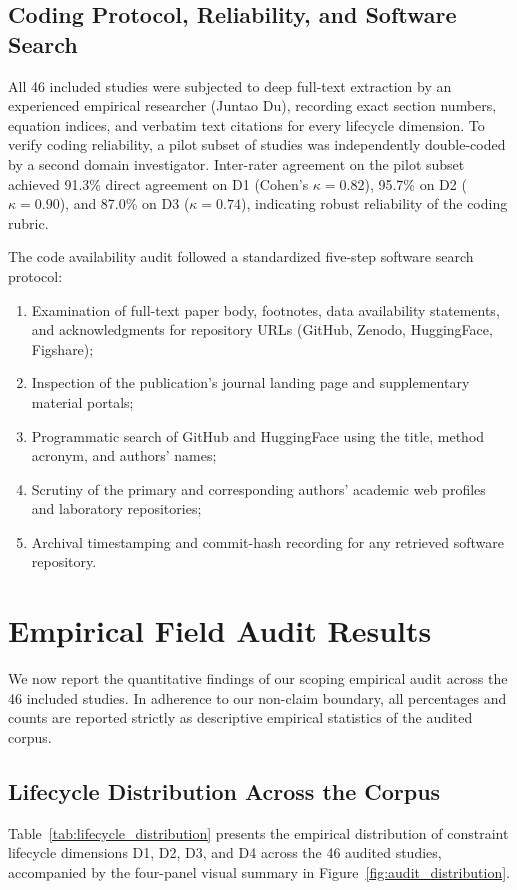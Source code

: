 \documentclass[preprint,3p,times]{elsarticle}
\begin{document}
\subsection{Coding Protocol, Reliability, and Software Search}
All 46 included studies were subjected to deep full-text extraction by an experienced empirical researcher (Juntao Du), recording exact section numbers, equation indices, and verbatim text citations for every lifecycle dimension. To verify coding reliability, a pilot subset of studies was independently double-coded by a second domain investigator. Inter-rater agreement on the pilot subset achieved 91.3\% direct agreement on D1 (Cohen's $\kappa = 0.82$), 95.7\% on D2 ($\kappa = 0.90$), and 87.0\% on D3 ($\kappa = 0.74$), indicating robust reliability of the coding rubric.

The code availability audit followed a standardized five-step software search protocol:
\begin{enumerate}[label=(\arabic*)]
    \item Examination of full-text paper body, footnotes, data availability statements, and acknowledgments for repository URLs (GitHub, Zenodo, HuggingFace, Figshare);
    \item Inspection of the publication's journal landing page and supplementary material portals;
    \item Programmatic search of GitHub and HuggingFace using the title, method acronym, and authors' names;
    \item Scrutiny of the primary and corresponding authors' academic web profiles and laboratory repositories;
    \item Archival timestamping and commit-hash recording for any retrieved software repository.
\end{enumerate}

\section{Empirical Field Audit Results}
\label{sec:results}

We now report the quantitative findings of our scoping empirical audit across the 46 included studies. In adherence to our non-claim boundary, all percentages and counts are reported strictly as descriptive empirical statistics of the audited corpus.

\subsection{Lifecycle Distribution Across the Corpus}
Table~\ref{tab:lifecycle_distribution} presents the empirical distribution of constraint lifecycle dimensions D1, D2, D3, and D4 across the 46 audited studies, accompanied by the four-panel visual summary in Figure~\ref{fig:audit_distribution}.
\end{document}
